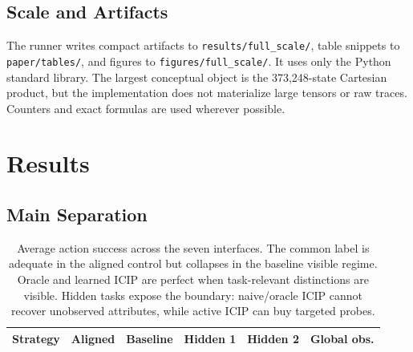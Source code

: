 \documentclass{article}
\newcommand{\icip}{\textsc{ICIP}}
\begin{document}
\subsection{Scale and Artifacts}

\begin{table}[t]
\centering
\caption{Full-scale v3 experiment size. The main grid is exact over latent states, interfaces, regimes, and methods. Learned partition rows use exact categorical probability calculations over the pair/action distributions induced by noisy majority probes.}
\label{tab:scale}
\end{table}

The runner writes compact artifacts to \texttt{results/full\_scale/}, table snippets to \texttt{paper/tables/}, and figures to \texttt{figures/full\_scale/}.
It uses only the Python standard library.
The largest conceptual object is the 373,248-state Cartesian product, but the implementation does not materialize large tensors or raw traces.
Counters and exact formulas are used wherever possible.

\section{Results}

\subsection{Main Separation}
\label{sec:main-results}

\begin{table}[t]
\centering
\caption{Average action success across the seven interfaces. The common label is adequate in the aligned control but collapses in the baseline visible regime. Oracle and learned \icip{} are perfect when task-relevant distinctions are visible. Hidden tasks expose the boundary: naive/oracle \icip{} cannot recover unobserved attributes, while active \icip{} can buy targeted probes.}
\label{tab:main-performance}
\small
\begin{tabular}{lrrrrr}
\toprule
Strategy & Aligned & Baseline & Hidden 1 & Hidden 2 & Global obs. \\
\midrule

\end{tabular}
\end{table}
\end{document}
